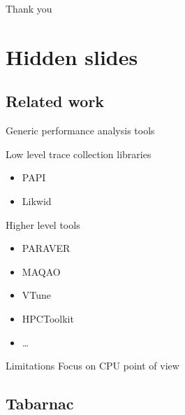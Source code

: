 \documentclass[xcolor={usenames,dvipsnames},hyperref={pdfusetitle}]{beamer}
\begin{document}
\begin{frame}{}
    \centering
    \Huge
    Thank you
\end{frame}

\section*{Hidden slides}

\subsection*{Related work}
\setcounter{framenumber}{\value{finalframe}}
\begin{frame}{Generic performance analysis tools}
    \begin{block}{Low level trace collection libraries}
        \begin{itemize}
            \item PAPI~\cite{Browne00Portable}
            \item Likwid~\cite{Treibig10LIKWID}
        \end{itemize}
    \end{block}
    \pause
    \begin{block}{Higher level tools}
        \begin{itemize}
            \item PARAVER~\cite{Pillet95PARAVER}
            \item MAQAO~\cite{Djoudi05MAQAO}
            \item VTune~\cite{Reinders05VTune}
            \item HPCToolkit~\cite{Adhianto10HPCTOOLKIT}
            \item \ldots
        \end{itemize}
    \end{block}
    \pause
    \begin{alertblock}{Limitations}
        Focus on CPU point of view
    \end{alertblock}
\end{frame}

\subsection*{Tabarnac}
\end{document}
